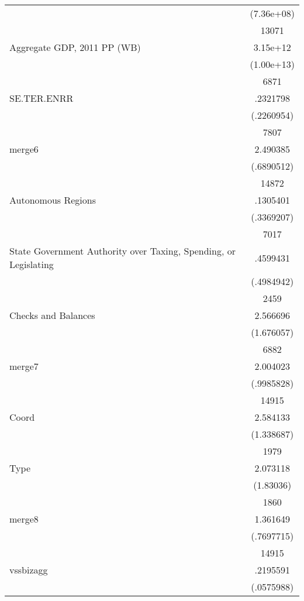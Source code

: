 {\begin{longtable}{l*{1}{c}}
                    &  (7.36e+08)\\
                    &       13071\\
Aggregate GDP, 2011 PP (WB)&    3.15e+12\\
                    &  (1.00e+13)\\
                    &        6871\\
SE.TER.ENRR         &    .2321798\\
                    &  (.2260954)\\
                    &        7807\\
merge6              &    2.490385\\
                    &  (.6890512)\\
                    &       14872\\
Autonomous Regions  &    .1305401\\
                    &  (.3369207)\\
                    &        7017\\
State Government Authority over Taxing, Spending, or Legislating&    .4599431\\
                    &  (.4984942)\\
                    &        2459\\
Checks and Balances &    2.566696\\
                    &  (1.676057)\\
                    &        6882\\
merge7              &    2.004023\\
                    &  (.9985828)\\
                    &       14915\\
Coord               &    2.584133\\
                    &  (1.338687)\\
                    &        1979\\
Type                &    2.073118\\
                    &   (1.83036)\\
                    &        1860\\
merge8              &    1.361649\\
                    &  (.7697715)\\
                    &       14915\\
vssbizagg           &    .2195591\\
                    &  (.0575988)\\

\end{longtable}}

